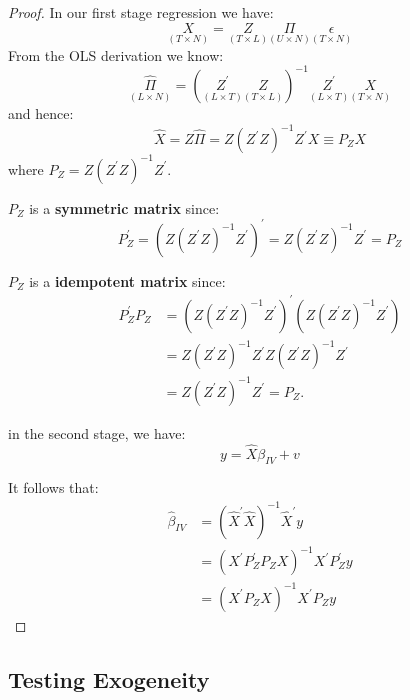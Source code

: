 \documentclass[11pt]{article}
\begin{document}
\begin{proof}
In our first stage regression we have:
\[\underset{(T \times N)}{X}=\underset{(T \times L)}{Z} \underset{(U \times N)}{\Pi} \underset{(T \times N)}{\epsilon}\]
From the OLS derivation we know:
\begin{equation}
\underset{(L \times N)}{\hat{\Pi}}=\left(\underset{(L \times T)}{Z^{\prime}} \underset{(T \times L)}{Z} \right)^{-1} \underset{(L \times T)}{Z^{\prime}}\underset{(T \times N)}{X}
\end{equation}
and hence:
\begin{equation}
\hat{X}=Z \hat{\Pi}=Z\left(Z^{\prime} Z\right)^{-1} Z^{\prime} X \equiv P_Z X
\end{equation}
where $P_Z=Z\left(Z^{\prime} Z\right)^{-1} Z^{\prime}$.

$P_Z$ is a \textbf{symmetric matrix} since:
\[P_Z^{\prime}=\left(Z\left(Z^{\prime} Z\right)^{-1} Z^{\prime}\right)^{\prime}=Z\left(Z^{\prime} Z\right)^{-1} Z^{\prime}=P_Z\]

$P_Z$ is a \textbf{idempotent matrix} since:
\begin{align*} P_Z^{\prime} P_Z & =\left(Z\left(Z^{\prime} Z\right)^{-1} Z^{\prime}\right)^{\prime}\left(Z\left(Z^{\prime} Z\right)^{-1} Z^{\prime}\right) \\ & =Z\left(Z^{\prime} Z\right)^{-1} Z^{\prime} Z\left(Z^{\prime} Z\right)^{-1} Z^{\prime} \\ & =Z\left(Z^{\prime} Z\right)^{-1} Z^{\prime}=P_Z .\end{align*}

in the second stage, we have:
\begin{equation}
y=\hat{X} \beta_{I V}+v
\end{equation}

It follows that:
\begin{equation}
\begin{aligned}
\hat{\beta}_{I V} & =\left(\hat{X}^{\prime} \hat{X}\right)^{-1} \hat{X}^{\prime} y \\
& =\left(X^{\prime} P_Z^{\prime} P_Z X\right)^{-1} X^{\prime} P_Z^{\prime} y \\
& =\left(X^{\prime} P_Z X\right)^{-1} X^{\prime} P_Z y
\end{aligned}
\end{equation}
\end{proof}

\subsection{Testing Exogeneity}
\end{document}
